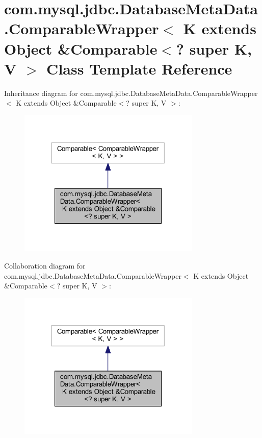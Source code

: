 \hypertarget{classcom_1_1mysql_1_1jdbc_1_1_database_meta_data_1_1_comparable_wrapper}{}\section{com.\+mysql.\+jdbc.\+Database\+Meta\+Data.\+Comparable\+Wrapper$<$ K extends Object \&Comparable$<$? super K, V $>$ Class Template Reference}
\label{classcom_1_1mysql_1_1jdbc_1_1_database_meta_data_1_1_comparable_wrapper}


Inheritance diagram for com.\+mysql.\+jdbc.\+Database\+Meta\+Data.\+Comparable\+Wrapper$<$ K extends Object \&Comparable$<$? super K, V $>$\+:
\nopagebreak
\begin{figure}[H]
\begin{center}
\leavevmode
\includegraphics[width=246pt]{classcom_1_1mysql_1_1jdbc_1_1_database_meta_data_1_1_comparable_wrapper__inherit__graph}
\end{center}
\end{figure}


Collaboration diagram for com.\+mysql.\+jdbc.\+Database\+Meta\+Data.\+Comparable\+Wrapper$<$ K extends Object \&Comparable$<$? super K, V $>$\+:
\nopagebreak
\begin{figure}[H]
\begin{center}
\leavevmode
\includegraphics[width=246pt]{classcom_1_1mysql_1_1jdbc_1_1_database_meta_data_1_1_comparable_wrapper__coll__graph}
\end{center}
\end{figure}
